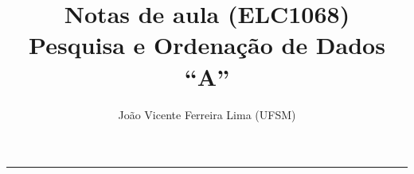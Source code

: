 \documentclass[a4paper,12pt,oneside]{article}
\title{Notas de aula (ELC1068)\\
Pesquisa e Ordenação de Dados ``A''}
\author{João Vicente Ferreira Lima (UFSM)}
\begin{document}
\maketitle

\tableofcontents
\rule{\textwidth}{1pt}


%
%
\end{document}

